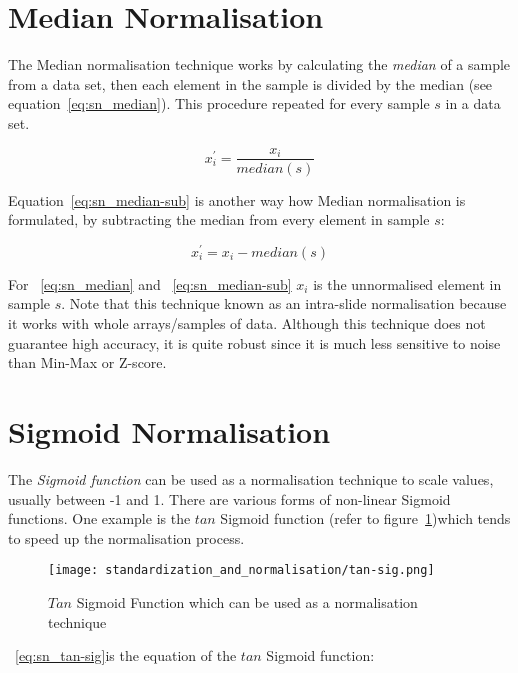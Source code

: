 \section{Median Normalisation}
The Median normalisation technique works by calculating the \emph{median} of a sample from a data set, then each element in the sample is divided by the median (see equation~\ref{eq:sn_median}).  This procedure repeated for every sample $s$ in a data set\citep{jayalakshmi2011statistical}.  

\begin{equation}
\label{eq:sn_median}
x^{\prime}_{i} = \frac{x_{i}}{median(s)}
\end{equation}

Equation~\ref{eq:sn_median-sub} is another way how Median normalisation is formulated, by subtracting the median from every element in sample $s$:

\begin{equation}
\label{eq:sn_median-sub}
x^{\prime}_{i} = x_{i} - median(s)
\end{equation}

For ~\ref{eq:sn_median} and  ~\ref{eq:sn_median-sub} $x_{i}$ is the unnormalised element in sample $s$.  Note that this technique known as an intra-slide normalisation because it works with whole arrays/samples of data.  Although this technique does not guarantee high accuracy, it is quite robust since it is much less sensitive to noise than Min-Max or Z-score\citep{jain2005score}.

\section{Sigmoid Normalisation}
The \emph{Sigmoid function} can be used as a normalisation technique to scale values, usually between -1 and 1.  There are various forms of non-linear Sigmoid functions.  One example is the $tan$ Sigmoid function (refer to figure~\ref{fig:sn_tag-sig})which tends to speed up the normalisation process\citep{jayalakshmi2011statistical}.

\begin{figure}
	\texttt{[image: standardization\_and\_normalisation/tan-sig.png]}
	\caption{$Tan$ Sigmoid Function which can be used as a normalisation technique}
	\label{fig:sn_tag-sig}
\end{figure}

~\ref{eq:sn_tan-sig}is the equation of the $tan$ Sigmoid function:

